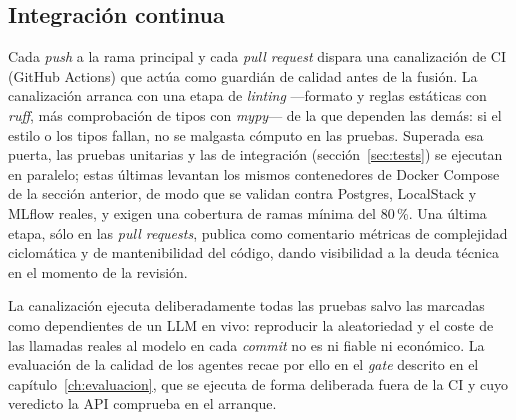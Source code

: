 \subsection{Integración continua}
\label{sec:ci}

Cada \textit{push} a la rama principal y cada \textit{pull request} dispara una canalización de
\ac{CI} (GitHub Actions) que actúa como guardián de calidad antes de la fusión. La canalización
arranca con una etapa de \textit{linting} —formato y reglas estáticas con \textit{ruff}, más
comprobación de tipos con \textit{mypy}— de la que dependen las demás: si el estilo o los tipos
fallan, no se malgasta cómputo en las pruebas. Superada esa puerta, las pruebas unitarias y las de
integración (sección~\ref{sec:tests}) se ejecutan en paralelo; estas últimas levantan los mismos
contenedores de Docker Compose de la sección anterior, de modo que se validan contra Postgres, LocalStack y
MLflow reales, y exigen una cobertura de ramas mínima del 80\,\%. Una última etapa, sólo en las \textit{pull requests}, publica
como comentario métricas de complejidad ciclomática y de mantenibilidad del código, dando
visibilidad a la deuda técnica en el momento de la revisión.

La canalización ejecuta deliberadamente todas las pruebas salvo las marcadas como dependientes de
un \ac{LLM} en vivo: reproducir la aleatoriedad y el coste de las llamadas reales al modelo en cada
\textit{commit} no es ni fiable ni económico. La evaluación de la calidad de los agentes recae por
ello en el \textit{gate} descrito en el capítulo~\ref{ch:evaluacion}, que se ejecuta de forma
deliberada fuera de la \ac{CI} y cuyo veredicto la \ac{API} comprueba en el arranque.

